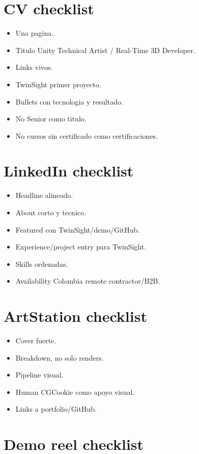 \section{CV checklist}


\begin{itemize}
\item Una pagina.
\item Titulo Unity Technical Artist / Real-Time 3D Developer.
\item Links vivos.
\item TwinSight primer proyecto.
\item Bullets con tecnologia y resultado.
\item No Senior como titulo.
\item No cursos sin certificado como certificaciones.
\end{itemize}


\section{LinkedIn checklist}


\begin{itemize}
\item Headline alineado.
\item About corto y tecnico.
\item Featured con TwinSight/demo/GitHub.
\item Experience/project entry para TwinSight.
\item Skills ordenadas.
\item Availability Colombia remote contractor/B2B.
\end{itemize}


\section{ArtStation checklist}


\begin{itemize}
\item Cover fuerte.
\item Breakdown, no solo renders.
\item Pipeline visual.
\item Human CGCookie como apoyo visual.
\item Links a portfolio/GitHub.
\end{itemize}


\section{Demo reel checklist}


